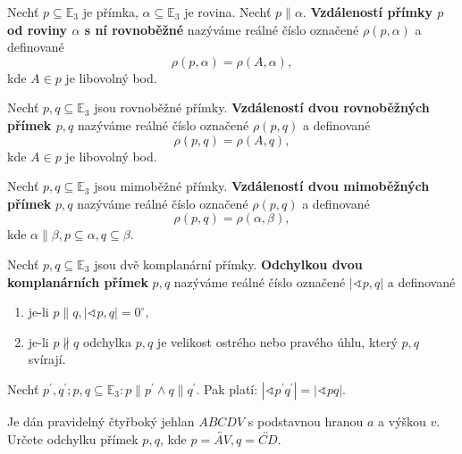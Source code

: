 \begin{definition}
    Nechť $p\subseteq \mathbb E_3$ je přímka, $\alpha \subseteq \mathbb E_3$ je rovina.
    Nechť $p\parallel \alpha.$ \textbf{Vzdáleností přímky $p$ od roviny $\alpha$
    s ní rovnoběžné} nazýváme reálné číslo označené $\rho(p,\alpha)$ a definované
    $$\rho(p,\alpha)=\rho(A,\alpha),$$
    kde $A\in p$ je libovolný bod.
\end{definition}

\begin{definition}
    Nechť $p,q\subseteq \mathbb E_3$ jsou rovnoběžné přímky. \textbf{Vzdáleností
    dvou rovnoběžných přímek $p,q$} nazýváme reálné číslo označené $\rho(p,q)$ a
    definované
    $$\rho(p,q) = \rho(A,q),$$
    kde $A\in p$ je libovolný bod.
\end{definition}

\begin{definition}
    Nechť $p,q\subseteq \mathbb E_3$ jsou mimoběžné přímky. \textbf{Vzdáleností dvou
    mimoběžných přímek} $p,q$ nazýváme reálné číslo označené $\rho(p,q)$ a definované
    $$\rho(p,q)=\rho(\alpha, \beta),$$
    kde $\alpha \parallel \beta, p\subseteq\alpha, q\subseteq \beta.$
\end{definition}

\begin{definition}
    Nechť $p,q\subseteq \mathbb E_3$ jsou dvě komplanární přímky. \textbf{Odchylkou
    dvou komplanárních přímek} $p,q$ nazýváme reálné číslo označené $|\sphericalangle
    p,q|$ a definované
    \begin{enumerate}[$i.$]
    \item je-li $p\parallel q, |\sphericalangle p,q|=0^\circ,$
   	\item je-li $p\nparallel q$ odchylka $p,q$ je velikost ostrého nebo pravého úhlu,
        který $p,q$ svírají.
    \end{enumerate}
\end{definition}

\begin{veta}
    Nechť $p^\prime, q^\prime; p,q\subseteq \mathbb E_3: p\parallel p^\prime\land
    q\parallel q^\prime.$ Pak platí: $|\sphericalangle p^\prime q^\prime|=|\sphericalangle p q|.$
\end{veta}

\begin{priklad}
Je dán pravidelný čtyřboký jehlan $ABCDV$ s podstavnou hranou $a$ a výškou $v$.
Určete odchylku přímek $p,q$, kde $p=\overleftrightarrow{AV}, q=\overleftrightarrow{CD}.$
\end{priklad}

